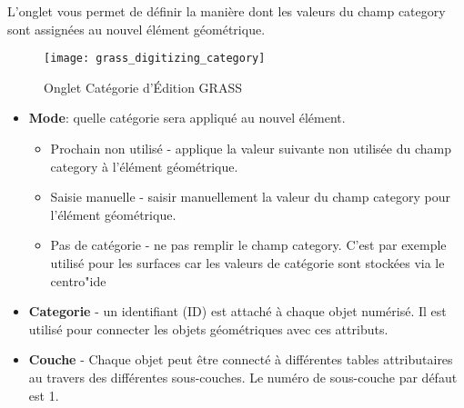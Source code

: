 L'onglet  vous permet de d\'efinir la mani\`ere dont les valeurs du champ category sont assign\'ees au nouvel \'el\'ement g\'eom\'etrique.

\begin{figure}[h]
 \begin{center}
  \caption{Onglet Cat\'egorie d'\'Edition GRASS \nixcaption}\label{fig:grass_digitizing_category}
  \texttt{[image: grass\_digitizing\_category]}
 \end{center}
\end{figure}

\begin{itemize}
\item \textbf{Mode}: quelle cat\'egorie sera appliqu\'e au nouvel \'el\'ement.
\begin{itemize}
\item Prochain non utilis\'e - applique la valeur suivante non utilis\'ee du champ category \`a l'\'el\'ement g\'eom\'etrique.
\item Saisie manuelle - saisir manuellement la valeur du champ category pour l'\'el\'ement g\'eom\'etrique.
\item Pas de cat\'egorie - ne pas remplir le champ category. C'est par exemple utilis\'e pour les surfaces car les valeurs de cat\'egorie sont stock\'ees via le centro"ide
\end{itemize}
\item \textbf{Categorie} - un identifiant (ID) est attach\'e \`a chaque objet num\'eris\'e. Il est utilis\'e pour connecter les objets g\'eom\'etriques avec ces attributs.
\item \textbf{Couche} - Chaque objet peut \^etre connect\'e \`a diff\'erentes tables attributaires au travers des diff\'erentes sous-couches. Le num\'ero de sous-couche par d\'efaut est 1.

\end{itemize}

